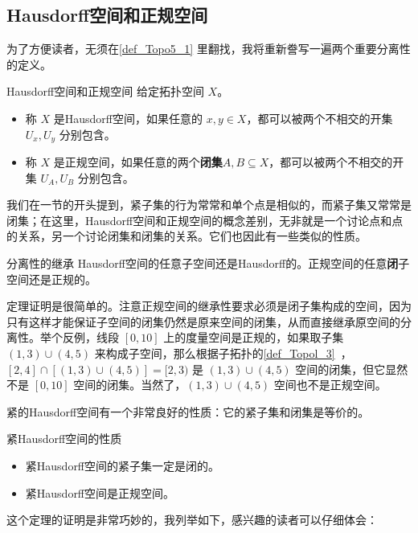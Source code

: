 \subsection{Hausdorff空间和正规空间}

为了方便读者，无须在\autoref{def_Topo5_1} 里翻找，我将重新誊写一遍两个重要分离性的定义。

\begin{definition}{Hausdorff空间和正规空间}\label{def_Topo5_2}
给定拓扑空间 $X$。
\begin{itemize}
\item 称 $X$ 是Hausdorff空间，如果任意的 $x,y\in X$，都可以被两个不相交的开集 $U_x, U_y$ 分别包含。
\item 称 $X$ 是正规空间，如果任意的两个\textbf{闭集}$A, B\subseteq X$，都可以被两个不相交的开集 $U_A, U_B$ 分别包含。
\end{itemize}
\end{definition}

我们在一节的开头提到，紧子集的行为常常和单个点是相似的，而紧子集又常常是闭集；在这里，Hausdorff空间和正规空间的概念差别，无非就是一个讨论点和点的关系，另一个讨论闭集和闭集的关系。它们也因此有一些类似的性质。

\begin{theorem}{分离性的继承}
Hausdorff空间的任意子空间还是Hausdorff的。正规空间的任意\textbf{闭}子空间还是正规的。
\end{theorem}

定理证明是很简单的。注意正规空间的继承性要求必须是闭子集构成的空间，因为只有这样才能保证子空间的闭集仍然是原来空间的闭集，从而直接继承原空间的分离性。举个反例，线段 $[0,10]$ 上的度量空间是正规的，如果取子集 $(1,3)\cup(4,5)$ 来构成子空间，那么根据子拓扑的\autoref{def_Topol_3}~，$[2,4]\cap[(1,3)\cup(4,5)]=[2,3)$ 是 $(1,3)\cup(4,5)$ 空间的闭集，但它显然不是 $[0,10]$ 空间的闭集。当然了，$(1,3)\cup(4,5)$ 空间也不是正规空间。

紧的Hausdorff空间有一个非常良好的性质：它的紧子集和闭集是等价的。
\begin{theorem}{紧Hausdorff空间的性质}
\begin{itemize}
\item 紧Hausdorff空间的紧子集一定是闭的。
\item 紧Hausdorff空间是正规空间。

\end{itemize}
\end{theorem}

这个定理的证明是非常巧妙的，我列举如下，感兴趣的读者可以仔细体会：

